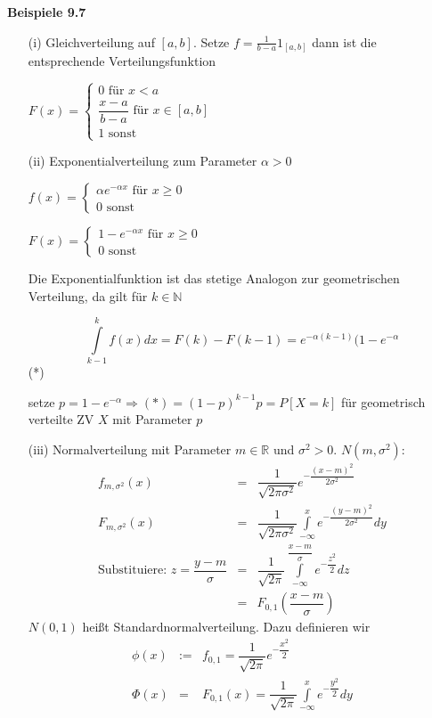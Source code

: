 \documentclass[10pt,a4paper]{report}
\newcommand{\N}{\mathbb{N}}
\newcommand{\R}{\mathbb{R}}
\numberwithin{equation}{section}
\numberwithin{figure}{section}
\theoremstyle{plain}
\theoremstyle{definition}
\theoremstyle{plain}
\theoremstyle{definition}
\theoremstyle{remark}
\theoremstyle{plain}
\begin{document}
\textbf{Beispiele 9.7}
\begin{itemize}
\item[(i)] Gleichverteilung auf $[a,b]$. Setze $f=\frac{1}{b-a}1_[a,b]$ dann ist die entsprechende Verteilungsfunktion
\begin{center}
$F(x)=\begin{cases}
0 \text{ für } x < a\\
\dfrac{x-a}{b-a} \text{ für } x \in [a,b]\\
1 \text{ sonst }
\end{cases}$
\end{center}
\item[(ii)] Exponentialverteilung zum Parameter $\alpha >0$
\begin{center}
$f(x)=\begin{cases}
\alpha e^{-\alpha x} \text{ für } x \geq 0\\
0 \text{ sonst }
\end{cases}$
\end{center}
\begin{center}
$F(x)=\begin{cases}
1-e^{-\alpha x} \text{ für } x \geq 0\\
0 \text{ sonst }
\end{cases}$
\end{center}
Die Exponentialfunktion ist das stetige Analogon zur geometrischen Verteilung, da gilt für $k \in \N$
\begin{center}
\[ \int\limits_{k-1}^k f(x)dx=F(k)-F(k-1)=e^{-\alpha(k-1)}(1-e^{-\alpha}\] \qquad (*)
\end{center}
setze $p=1-e^{-\alpha} \Rightarrow (*)=(1-p)^{k-1}p=P[X=k]$ für geometrisch verteilte ZV $X$ mit Parameter $p$
\item[(iii)] Normalverteilung mit Parameter $m \in \R$ und $\sigma^2>0$. $N(m,\sigma^2)$:
\begin{eqnarray*}
f_{m,\sigma^2}(x)&=&\dfrac{1}{\sqrt{2\pi \sigma^2}} e^{-\dfrac{(x-m)^2}{2\sigma^2}}\\
F_{m,\sigma^2}(x)&=&\dfrac{1}{\sqrt{2\pi \sigma^2}} \int\limits_{-\infty}^xe^{-\dfrac{(y-m)^2}{2\sigma^2}}dy\\
\text{Substituiere: }z=\dfrac{y-m}{\sigma}&=&\dfrac{1}{\sqrt{2\pi}} \int\limits_{-\infty}^{\dfrac{x-m}{\sigma}}e^{-\dfrac{z^2}{2}}dz\\
&=&F_{0,1}\left(\dfrac{x-m}{\sigma}\right)
\end{eqnarray*}
$N(0,1)$ heißt Standardnormalverteilung. Dazu definieren wir
\begin{eqnarray*}
\phi(x)&:=& f_{0,1}=\dfrac{1}{\sqrt{2\pi}}e^{-\dfrac{x^2}{2}}\\
\Phi(x)&=& F_{0,1}(x)=\dfrac{1}{\sqrt{2\pi}}\int\limits_{-\infty}^x e^{-\dfrac{y^2}{2}}dy
\end{eqnarray*}
\end{itemize}
\end{document}
